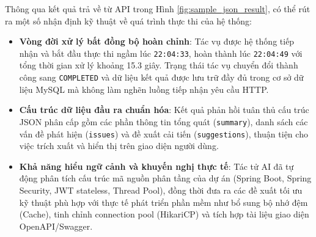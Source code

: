 \documentclass[12pt,a4paper]{report}
\begin{document}
Thông qua kết quả trả về từ API trong Hình \ref{fig:sample_json_result}, có thể rút ra một số nhận định kỹ thuật về quá trình thực thi của hệ thống:
\begin{itemize}
    \item \textbf{Vòng đời xử lý bất đồng bộ hoàn chỉnh}: Tác vụ được hệ thống tiếp nhận và bắt đầu thực thi ngầm lúc \texttt{22:04:33}, hoàn thành lúc \texttt{22:04:49} với tổng thời gian xử lý khoảng 15.3 giây. Trạng thái tác vụ chuyển đổi thành công sang \texttt{COMPLETED} và dữ liệu kết quả được lưu trữ đầy đủ trong cơ sở dữ liệu MySQL mà không làm nghẽn luồng tiếp nhận yêu cầu HTTP.
    \item \textbf{Cấu trúc dữ liệu đầu ra chuẩn hóa}: Kết quả phản hồi tuân thủ cấu trúc JSON phân cấp gồm các phần thông tin tổng quát (\texttt{summary}), danh sách các vấn đề phát hiện (\texttt{issues}) và đề xuất cải tiến (\texttt{suggestions}), thuận tiện cho việc trích xuất và hiển thị trên giao diện người dùng.
    \item \textbf{Khả năng hiểu ngữ cảnh và khuyến nghị thực tế}: Tác tử AI đã tự động phân tích cấu trúc mã nguồn phân tầng của dự án (Spring Boot, Spring Security, JWT stateless, Thread Pool), đồng thời đưa ra các đề xuất tối ưu kỹ thuật phù hợp với thực tế phát triển phần mềm như bổ sung bộ nhớ đệm (Cache), tinh chỉnh connection pool (HikariCP) và tích hợp tài liệu giao diện OpenAPI/Swagger.
\end{itemize}
\end{document}
